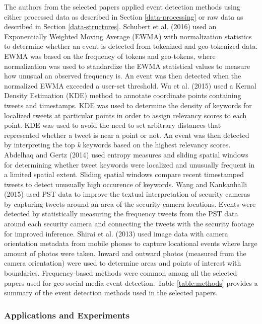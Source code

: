 The authors from the selected papers applied event detection methods using either processed data as described in Section \ref{data-processing} or raw data as described in Section \ref{data-structures}. Schubert et al. (2016) \cite{Schubert:2016} used an Exponentially Weighted Moving Average (EWMA) with normalization statistics to determine whether an event is detected from tokenized and geo-tokenized data. EWMA was based on the frequency of tokens and geo-tokens, where normalization was used to standardize the EWMA statistical values to measure how unusual an observed frequency is. An event was then detected when the normalized EWMA exceeded a user-set threshold. Wu et al. (2015) \cite{Wu:2015} used a Kernal Density Estimation (KDE) method to annotate coordinate points containing tweets and timestamps. KDE was used to determine the density of keywords for localized tweets at particular points in order to assign relevancy scores to each point. KDE was used to avoid the need to set arbitrary distances that represented whether a tweet is near a point or not. An event was then detected by interpreting the top \textit{k} keywords based on the highest relevancy scores. Abdelhaq and Gertz (2014) \cite{Abdelhaq:2014} used entropy measures and sliding spatial windows for determining whether tweet keywords were localized and unusually frequent in a limited spatial extent. Sliding spatial windows compare recent timestamped tweets to detect unusually high occurence of keywords. Wang and Kankanhalli (2015) \cite{Wang:2015} used PST data to improve the textual interpretation of security cameras by capturing tweets around an area of the security camera locations. Events were detected by statistically measuring the frequency tweets from the PST data around each security camera and connecting the tweets with the security footage for improved inference. Shirai et al. (2013) \cite{Shirai:2013} used image data with camera orientation metadata from mobile phones to capture locational events where large amount of photos were taken. Inward and outward photos (measured from the camera orientation) were used to determine areas and points of interest with boundaries. Frequency-based methods were common among all the selected papers used for geo-social media event detection. Table \ref{table:methods} provides a summary of the event detection methods used in the selected papers.

\subsubsection{Applications and Experiments} \label{applications-and-experiments}

